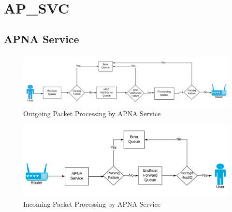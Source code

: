 
\chapter{AP\_SVC} %

\label{apna_service}

\section{APNA Service}

\begin{figure}[th!!]
\centering
\hspace*{-2cm}\includegraphics[scale=0.3]{Figures/svc.png}
\decoRule
\caption[APNA Service Outgoing Packet]{Outgoing Packet Processing by APNA Service}
\label{fig:perf_ephid}
\end{figure}

\begin{figure}[th!!]
\centering
\includegraphics[scale=0.24]{Figures/svc_out.png}
\decoRule
\caption[APNA Service Incoming Packet]{Incoming Packet Processing by APNA Service}
\label{fig:perf_ephid}
\end{figure}